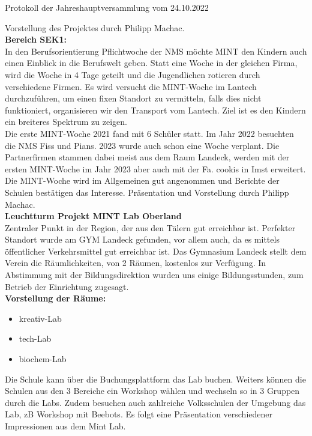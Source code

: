 \documentclass{scrartcl}
\newcommand\obmann{Philipp Machac}
\begin{document}
\begin{Minutes}{Protokoll der Jahreshauptversammlung vom 24.10.2022}


  Vorstellung des Projektes durch \obmann.\\

  \textbf{Bereich SEK1:}\\
  In den Berufsorientierung Pflichtwoche der NMS möchte MINT den Kindern auch einen Einblick in die Berufswelt geben. Statt eine Woche in der gleichen Firma, wird die Woche in 4 Tage geteilt und die Jugendlichen rotieren durch verschiedene Firmen.
  Es wird versucht die MINT-Woche im Lantech durchzuführen, um einen fixen Standort zu vermitteln, falls dies nicht funktioniert, organisieren wir den Transport vom Lantech. Ziel ist es den Kindern ein breiteres Spektrum zu zeigen.
  \\
  Die erste MINT-Woche 2021 fand mit 6 Schüler statt. Im Jahr 2022 besuchten die NMS Fiss und Pians. 2023 wurde auch schon eine Woche verplant.
  Die Partnerfirmen stammen dabei meist aus dem Raum Landeck, werden mit der ersten MINT-Woche im Jahr 2023 aber auch mit der Fa. cookis in Imst erweitert.
  Die MINT-Woche wird im Allgemeinen gut angenommen und Berichte der Schulen bestätigen das Interesse.
  Präsentation und Vorstellung durch \obmann.\\

  \textbf{Leuchtturm Projekt MINT Lab Oberland} \\
  Zentraler Punkt in der Region, der aus den Tälern gut erreichbar ist. Perfekter Standort wurde am GYM Landeck gefunden, vor allem auch, da es mittels öffentlicher Verkehrsmittel gut erreichbar ist.
  Das Gymnasium Landeck stellt dem Verein die Räumlichkeiten, von 2 Räumen, kostenlos zur Verfügung.
  In Abstimmung mit der Bildungsdirektion wurden uns einige Bildungsstunden, zum Betrieb der Einrichtung zugesagt.\\
  \textbf{Vorstellung der Räume:}
  \begin{itemize}
    \item kreativ-Lab
    \item tech-Lab
    \item biochem-Lab
  \end{itemize}

  Die Schule kann über die Buchungsplattform das Lab buchen.
  Weiters können die Schulen aus den 3 Bereiche ein Workshop wählen und wechseln so in 3 Gruppen durch die Labs.
  Zudem besuchen auch zahlreiche Volksschulen der Umgebung das Lab, zB Workshop mit Beebots.
  Es folgt eine Präsentation verschiedener Impressionen aus dem Mint Lab.


\end{Minutes}
\end{document}

